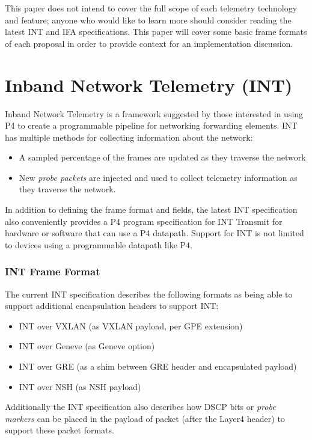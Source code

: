 \documentclass[letterpaper,twocolumn,10pt]{article}
\begin{document}
This paper does not intend to cover the full scope of each telemetry
technology and feature; anyone who would like to learn more should
consider reading the latest INT and IFA specifications.  This paper will
cover some basic frame formats of each proposal in order to provide
context for an implementation discussion.

\section{Inband Network Telemetry (INT)}

Inband Network Telemetry is a framework suggested by
those interested in using P4 to create a programmable pipeline for
networking forwarding elements.  INT has multiple methods for collecting
information about the network:

\begin{itemize}
\item A sampled percentage of the frames are updated as they traverse
the network 
\item New \textit{probe packets} are injected and used to collect
telemetry information as they traverse the network.
\end{itemize}
In addition to defining the frame format and fields, the latest INT
specification also conveniently provides a P4 program specification for
INT Transmit for hardware or software that can use a P4 datapath.
Support for INT is not limited to devices using a programmable datapath
like P4.

\subsubsection{INT Frame Format}

The current INT specification describes the following formats as being able to
support additional encapsulation headers to support INT:

\begin{itemize}
\item INT over VXLAN (as VXLAN payload, per GPE extension)
\item INT over Geneve (as Geneve option)
\item INT over GRE (as a shim between GRE header and encapsulated payload)
\item INT over NSH (as NSH payload)
\end{itemize}

Additionally the INT specification also describes how DSCP bits or
\textit{probe markers} can be placed in the payload of packet (after the Layer4
header) to support these packet formats.
\end{document}
